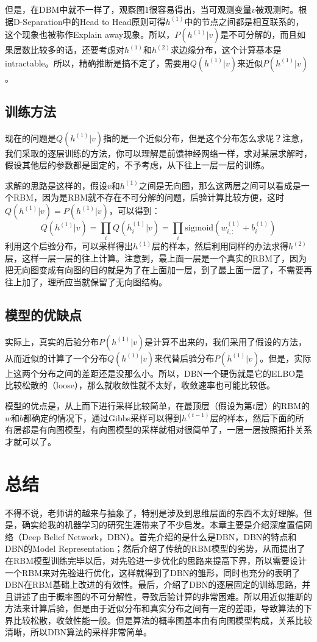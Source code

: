 \documentclass[a4paper]{article}
\begin{document}
但是，在DBM中就不一样了，观察图1很容易得出，当可观测变量$v$被观测时。根据D-Separation中的Head to Head原则可得$h^{(1)}$中的节点之间都是相互联系的，这个现象也被称作Explain away现象。所以，$P(h^{(1)}|v)$是不可分解的，而且如果层数比较多的话，还要考虑对$h^{(1)}$和$h^{(2)}$求边缘分布，这个计算基本是intractable。所以，精确推断是搞不定了，需要用$Q(h^{(1)}|v)$来近似$P(h^{(1)}|v)$。

\subsection{训练方法}
现在的问题是$Q(h^{(1)}|v)$指的是一个近似分布，但是这个分布怎么求呢？注意，我们采取的逐层训练的方法，你可以理解是前馈神经网络一样，求对某层求解时，假设其他层的参数都是固定的，不予考虑，从下往上一层一层的训练。

求解的思路是这样的，假设$v$和$h^{(1)}$之间是无向图，那么这两层之间可以看成是一个RBM，因为是RBM就不存在不可分解的问题，后验计算比较方便，这时$Q(h^{(1)}|v) = P(h^{(1)}|v)$，可以得到：
\begin{equation}
    Q(h^{(1)}|v) = \prod_i Q(h^{(1)}_i|v) = \prod_i \text{sigmoid}\left( w^{(1)}_{i,:} + b^{(1)}_i \right)
\end{equation}
利用这个后验分布，可以采样得出$h^{(1)}$层的样本，然后利用同样的办法求得$h^{(2)}$层，这样一层一层的往上计算。注意到，最上面一层是一个真实的RBM了，因为把无向图变成有向图的目的就是为了在上面加一层，到了最上面一层了，不需要再往上加了，理所应当就保留了无向图结构。

\subsection{模型的优缺点}
实际上，真实的后验分布$P(h^{(1)}|v)$是计算不出来的，我们采用了假设的方法，从而近似的计算了一个分布$Q(h^{(1)}|v)$来代替后验分布$P(h^{(1)}|v)$。但是，实际上这两个分布之间的差距还是没那么小。所以，DBN一个硬伤就是它的ELBO是比较松散的（loose），那么就收敛性就不太好，收敛速率也可能比较低。

模型的优点是，从上而下进行采样比较简单，在最顶层（假设为第$t$层）的RBM的$w$和$b$都确定的情况下，通过Gibbs采样可以得到$h^{(t-1)}$层的样本，然后下面的所有层都是有向图模型，有向图模型的采样就相对很简单了，一层一层按照拓扑关系才就可以了。

\section{总结}
不得不说，老师讲的越来与抽象了，特别是涉及到思维层面的东西不太好理解。但是，确实给我的机器学习的研究生涯带来了不少启发。本章主要是介绍深度置信网络（Deep Belief Network，DBN）。首先介绍的是什么是DBN，DBN的特点和DBN的Model Representation；然后介绍了传统的RBM模型的劣势，从而提出了在RBM模型训练完毕以后，对先验进一步优化的思路来提高下界，所以需要设计一个RBM来对先验进行优化，这样就得到了DBN的雏形，同时也充分的表明了DBN在RBM基础上改进的有效性。最后，介绍了DBN的逐层固定的训练思路，并且讲述了由于概率图的不可分解性，导致后验计算的非常困难。所以用近似推断的方法来计算后验，但是由于近似分布和真实分布之间有一定的差距，导致算法的下界比较松散，收敛性能一般。但是算法的概率图基本由有向图模型构成，关系比较清晰，所以DBN算法的采样非常简单。
\end{document}
